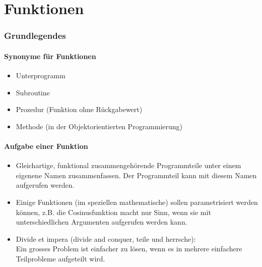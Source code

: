 
\part{Funktionen}
\label{sec:Funktionen}


\section{Grundlegendes}
\label{sec:Grundlegendes}

\subsection{Synonyme für Funktionen}
\label{sec:Synonyme fuer Funktionen}
\begin{itemize}
	\item Unterprogramm
	\item Subroutine
	\item Prozedur (Funktion ohne Rückgabewert)
	\item Methode (in der Objektorientierten Programmierung)
\end{itemize}

\subsection{Aufgabe einer Funktion}
\label{sec:Aufgabe einer Funktion}
\begin{itemize}
	\item Gleichartige, funktional zusammengehörende Programmteile unter einem eigenene Namen zusammenfassen. Der Programmteil kann mit diesem Namen aufgerufen werden.
	\item Einige Funktionen (im speziellen mathematische) sollen parametrisiert werden können, z.B. die Cosinusfunktion macht nur Sinn, wenn sie mit unterschiedlichen Argumenten aufgerufen werden kann.
	\item Divide et impera (divide and conquer, teile und herrsche):
	\\ Ein grosses Problem ist einfacher zu lösen, wenn es in mehrere einfachere Teilprobleme aufgeteilt wird.
\end{itemize}

